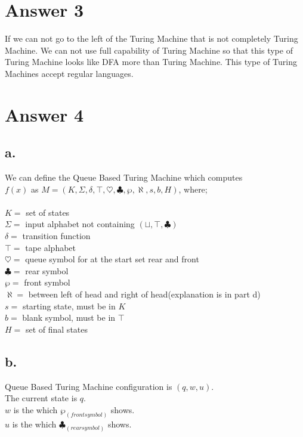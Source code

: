 \documentclass[12pt]{article}
\begin{document}
\section*{Answer 3}

If we can not go to the left of the Turing Machine that is not completely Turing Machine. We can not use full capability of Turing Machine so that this type of Turing Machine looks like DFA more than Turing Machine. This type of Turing Machines accept regular languages.


\section*{Answer 4}





\subsection*{a.}

We can define the Queue Based Turing Machine which computes\\
 $f(x)$ as $M = (K,\Sigma,\delta, \top, \heartsuit, \clubsuit,\wp,\aleph, s,b, H)$, where;\\
\\
$K=$ set of states\\
$\Sigma=$ input alphabet not containing $(\sqcup, \top,\clubsuit)$\\
$\delta=$ transition function\\
$\top=$ tape alphabet\\
$\heartsuit=$ queue symbol for at the start set rear and front \\
$\clubsuit=$ rear symbol\\
$\wp=$ front symbol\\
$\aleph=$ between left of head and right of head(explanation is in part d)\\
$s=$ starting state, must be in $K$\\
$b=$ blank symbol, must be in $\top$\\
$H=$ set of final states 

\subsection*{b.}

Queue Based Turing Machine configuration is $(q, w, u)$. \\
The current state is $q$.\\
$w$ is the which $\wp_{(front symbol)}$ shows.\\
$u$ is the which $\clubsuit_{(rear symbol)}$ shows.\\
\end{document}
